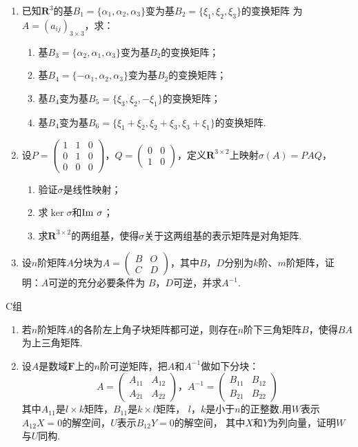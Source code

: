 \begin{enumerate}
    \item 已知$\mathbf{R}^3$的基$B_1=\{\alpha_1,\alpha_2,\alpha_3\}$变为基$B_2=\{\xi_1,\xi_2,\xi_3\}$的变换矩阵
	为$A=(a_{ij})_{3 \times 3}$，求：
    \begin{enumerate}[label=(\arabic*)]
        \item 基$B_3=\{\alpha_2,\alpha_1,\alpha_3\}$变为基$B_2$的变换矩阵；
        \item 基$B_4=\{-\alpha_1,\alpha_2,\alpha_3\}$变为基$B_2$的变换矩阵；
        \item 基$B_4$变为基$B_5=\{\xi_3,\xi_2,-\xi_1\}$的变换矩阵；
        \item 基$B_4$变为基$B_6=\{\xi_1+\xi_2,\xi_2+\xi_3,\xi_3+\xi_1\}$的变换矩阵.
    \end{enumerate}
	\item 设$P=\begin{pmatrix}
		1 & 1 & 0 \\ 0 & 1 & 0 \\ 0 & 0 & 0
	\end{pmatrix}$，$Q=\begin{pmatrix}
		0 & 0 \\ 1 & 0
	\end{pmatrix}$，定义$\mathbf{R}^{3\times 2}$上映射$\sigma(A)=PAQ$，
    \begin{enumerate}
        \item 验证$\sigma$是线性映射；
        \item 求$\ker\sigma$和$\textup{Im }\sigma$；
        \item 求$\mathbf{R}^{3\times 2}$的两组基，使得$\sigma$关于这两组基的表示矩阵是对角矩阵.
    \end{enumerate}
    \item 设$n$阶矩阵$A$分块为$A=\begin{pmatrix}
		B & O \\ C & D
	\end{pmatrix}$，其中$B$，$D$分别为$k$阶、$m$阶矩阵，证明：$A$可逆的充分必要条件为
	$B$，$D$可逆，并求$A^{-1}$.
\end{enumerate}
\centerline{\heiti C组}
\begin{enumerate}
    \item 若$n$阶矩阵$A$的各阶左上角子块矩阵都可逆，则存在$n$阶下三角矩阵$B$，使得$BA$为上三角矩阵.
    \item 设$A$是数域$\mathbf{F}$上的$n$阶可逆矩阵，把$A$和$A^{-1}$做如下分块：
	\[A=\begin{pmatrix}
		A_{11} & A_{12} \\ A_{21} & A_{22}
	\end{pmatrix}，A^{-1}=\begin{pmatrix}
		B_{11} & B_{12} \\ B_{21} & B_{22}
	\end{pmatrix}\]
	其中$A_{11}$是$l \times k$矩阵，$B_{11}$是$k \times l$矩阵，
	$l$，$k$是小于$n$的正整数.用$W$表示$A_{12}X=0$的解空间，$U$表示$B_{12}Y=0$的解空间，
	其中$X$和$Y$为列向量，证明$W$与$U$同构.
\end{enumerate}
